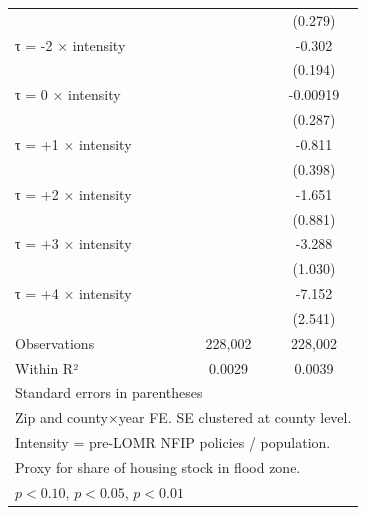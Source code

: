 \begin{table}[htbp]
\begin{tabular}{l*{2}{c}}
                    &                     &     (0.279)         \\
[0.15em]
τ = -2 × intensity  &                     &      -0.302         \\
                    &                     &     (0.194)         \\
[0.15em]
τ = 0 × intensity   &                     &    -0.00919         \\
                    &                     &     (0.287)         \\
[0.15em]
τ = +1 × intensity  &                     &      -0.811\sym{**} \\
                    &                     &     (0.398)         \\
[0.15em]
τ = +2 × intensity  &                     &      -1.651\sym{*}  \\
                    &                     &     (0.881)         \\
[0.15em]
τ = +3 × intensity  &                     &      -3.288\sym{***}\\
                    &                     &     (1.030)         \\
[0.15em]
τ = +4 × intensity  &                     &      -7.152\sym{***}\\
                    &                     &     (2.541)         \\
\hline
Observations        &     228,002         &     228,002         \\
Within R²           &      0.0029         &      0.0039         \\
\hline\hline
\multicolumn{3}{l}{\footnotesize Standard errors in parentheses}\\
\multicolumn{3}{l}{\footnotesize Zip and county×year FE. SE clustered at county level.}\\
\multicolumn{3}{l}{\footnotesize Intensity = pre-LOMR NFIP policies / population.}\\
\multicolumn{3}{l}{\footnotesize Proxy for share of housing stock in flood zone.}\\
\multicolumn{3}{l}{\footnotesize \sym{*} \(p<0.10\), \sym{**} \(p<0.05\), \sym{***} \(p<0.01\)}\\
\end{tabular}
\end{table}
